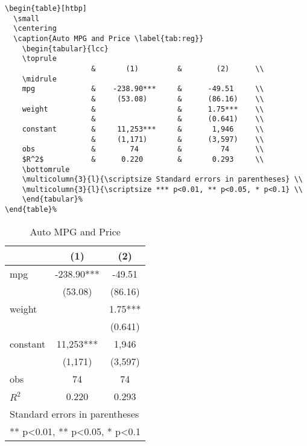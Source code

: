 \documentclass[11pt]{elegantpaper}
\begin{document}
\begin{lstlisting}
\begin{table}[htbp]
  \small
  \centering
  \caption{Auto MPG and Price \label{tab:reg}}
    \begin{tabular}{lcc}
    \toprule
                    &       (1)         &        (2)      \\
    \midrule
    mpg             &    -238.90***     &      -49.51     \\
                    &     (53.08)       &      (86.16)    \\
    weight          &                   &      1.75***    \\
                    &                   &      (0.641)    \\
    constant        &     11,253***     &       1,946     \\
                    &     (1,171)       &      (3,597)    \\
    obs             &        74         &         74      \\
    $R^2$           &      0.220        &       0.293     \\
    \bottomrule
    \multicolumn{3}{l}{\scriptsize Standard errors in parentheses} \\
    \multicolumn{3}{l}{\scriptsize *** p<0.01, ** p<0.05, * p<0.1} \\
    \end{tabular}%
\end{table}%
\end{lstlisting}
\begin{table}[htbp]
  \small
  \centering
  \caption{Auto MPG and Price \label{tab:reg}}
    \begin{tabular}{lcc}
    \toprule
                    &       (1)         &        (2)      \\
    \midrule
    mpg             &    -238.90***     &      -49.51     \\
                    &     (53.08)       &      (86.16)    \\
    weight          &                   &      1.75***    \\
                    &                   &      (0.641)    \\
    constant        &     11,253***     &       1,946     \\
                    &     (1,171)       &      (3,597)   \\
    obs             &        74         &         74     \\
    $R^2$           &      0.220        &       0.293    \\
    \bottomrule
    \multicolumn{3}{l}{\scriptsize Standard errors in parentheses} \\
    \multicolumn{3}{l}{\scriptsize *** p<0.01, ** p<0.05, * p<0.1} \\
    \end{tabular}%
\end{table}%
\end{document}
